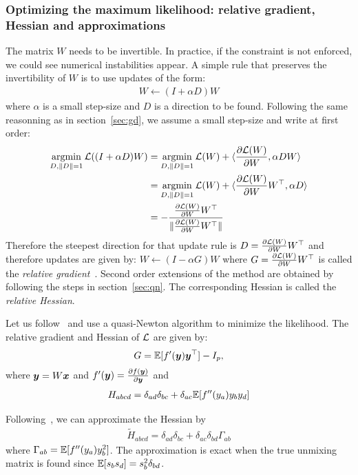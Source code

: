 \subsubsection{Optimizing the maximum likelihood: relative gradient, Hessian and approximations}
\label{sec:opt:likelihood:relativegradient}
The matrix $W$ needs to be invertible. In practice, if the constraint is not
enforced, we could see numerical instabilities appear.
A simple rule that preserves the invertibility of $W$ is to use updates of the
form:
\begin{align}
  W \leftarrow (I + \alpha D)W \label{eq:mult:update}
\end{align}
where $\alpha$ is a small step-size and $D$ is a direction to be found.
Following the same reasonning as in section~\ref{sec:gd}, we assume a small step-size
and write at first order:
\begin{align}
  \argmin_{D, \|D\|=1} \loss((I + \alpha D)W) &= \argmin_{D, \|D\|=1} \loss(W) + \dotp{ \partialfrac{W}{\loss(W)} }{ \alpha D W } \\
                                              &= \argmin_{D, \|D\|=1} \loss(W) + \dotp{ \partialfrac{W}{\loss(W)} W^{\top} }{ \alpha D } \\
                                              &= -\frac{\partialfrac{W}{\loss(W)} W^{\top}}{\|\partialfrac{W}{\loss(W)} W^{\top} \|}
\end{align}
Therefore the steepest direction for that update rule is $D =
\partialfrac{W}{\loss(W)} W^{\top}$ and therefore updates are given by:
$W \leftarrow (I - \alpha G)W$ where $G = \partialfrac{W}{\loss(W)} W^{\top}$ is called the \emph{relative
  gradient}~\cite{cardoso1996equivariant}.
Second order extensions of the method are obtained by following the steps in
section~\ref{sec:qn}. The corresponding Hessian is called the \emph{relative
  Hessian}.


Let us follow~\cite{ablin2018faster} and use a quasi-Newton algorithm to minimize the likelihood.
The relative gradient and Hessian of $\loss$ are given by:
\begin{align}
  G = \EE[f'(\yb) \yb^{\top}] - I_p,
\end{align}
where $\yb = W \xb$ and $f'(\yb) = \partialfrac{\yb}{f(\yb)}$ 
and
\begin{align}
  H_{abcd} =  \delta_{ad}\delta_{bc} + \delta_{ac} \EE[f''(y_a)y_by_d]
\end{align}

Following~\cite{ablin2018faster}, we can approximate the Hessian by
\begin{align}
  \tilde{H}_{abcd} = \delta_{ad} \delta_{bc} + \delta_{ac} \delta_{bd} \Gamma_{ab}
\end{align}
where $\Gamma_{ab} = \EE[f''(y_a) y_b^2]$.
The approximation is exact when the true unmixing matrix is found since $\EE[s_b s_d] =  s_b^2\delta_{bd}$.


